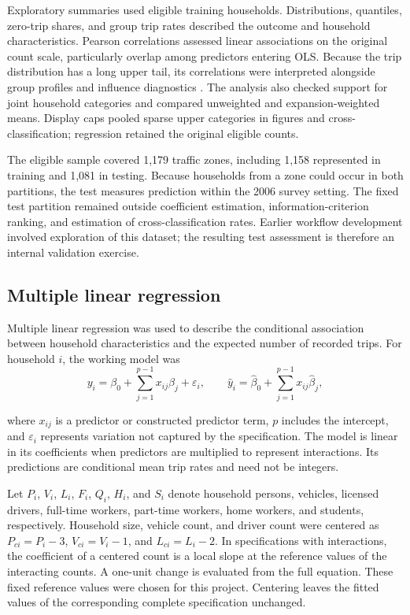 Exploratory summaries used eligible training households. Distributions, quantiles, zero-trip shares, and group trip rates described the outcome and household characteristics. Pearson correlations assessed linear associations on the original count scale, particularly overlap among predictors entering OLS. Because the trip distribution has a long upper tail, its correlations were interpreted alongside group profiles and influence diagnostics \cite{deWinter2016}. The analysis also checked support for joint household categories and compared unweighted and expansion-weighted means. Display caps pooled sparse upper categories in figures and cross-classification; regression retained the original eligible counts.

The eligible sample covered 1,179 traffic zones, including 1,158 represented in training and 1,081 in testing. Because households from a zone could occur in both partitions, the test measures prediction within the 2006 survey setting. The fixed test partition remained outside coefficient estimation, information-criterion ranking, and estimation of cross-classification rates. Earlier workflow development involved exploration of this dataset; the resulting test assessment is therefore an internal validation exercise.

\subsection{Multiple linear regression}
\begin{samepage}
Multiple linear regression was used to describe the conditional association between household characteristics and the expected number of recorded trips. For household $i$, the working model was
\begin{equation}
 y_i = \beta_0 + \sum_{j=1}^{p-1} x_{ij}\beta_j + \varepsilon_i,
 \qquad \widehat y_i = \widehat\beta_0 + \sum_{j=1}^{p-1}x_{ij}\widehat\beta_j,
 \label{eq:mlr}
\end{equation}
\end{samepage}
where $x_{ij}$ is a predictor or constructed predictor term, $p$ includes the intercept, and $\varepsilon_i$ represents variation not captured by the specification. The model is linear in its coefficients when predictors are multiplied to represent interactions. Its predictions are conditional mean trip rates and need not be integers.

Let $P_i$, $V_i$, $L_i$, $F_i$, $Q_i$, $H_i$, and $S_i$ denote household persons, vehicles, licensed drivers, full-time workers, part-time workers, home workers, and students, respectively. Household size, vehicle count, and driver count were centered as $P_{ci}=P_i-3$, $V_{ci}=V_i-1$, and $L_{ci}=L_i-2$. In specifications with interactions, the coefficient of a centered count is a local slope at the reference values of the interacting counts. A one-unit change is evaluated from the full equation. These fixed reference values were chosen for this project. Centering leaves the fitted values of the corresponding complete specification unchanged.

